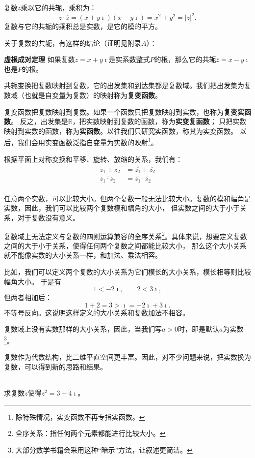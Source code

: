 \documentclass[12pt,UTF8,fontset=none]{ctexbook}
\begin{document}
复数$z$乘以它的共轭，乘积为：
$$ z \cdot \overline{z} = (x+ y\imath)(x - y\imath) = x^2 + y^2 = |z|^2. $$
复数与它的共轭的乘积总是实数，是它的模的平方。

关于复数的共轭，有这样的结论（证明见附录$A$）：
\begin{tm}{\textbf{虚根成对定理}}
    如果复数$z=x+y\imath$是实系数整式$P$的根，那么它的共轭$\overline{z}=x-y\imath$也是$P$的根。
\end{tm}

共轭变换把复数映射到复数，它的出发集和到达集都是复数域。我们把出发集为复数域（也就是自变量为复数）的映射称为\textbf{复变函数}。

复变函数把复数映射到复数。如果一个函数只把复数映射到实数，也称为\textbf{复变实函数}。
反之，出发集是$\mathbb{R}$，把实数映射到复数的函数，称为\textbf{实变复函数}；
只把实数映射到实数的函数，称为\textbf{实函数}。以往我们只研究实函数，称其为实变函数。
以后，我们会用实变函数泛指自变量为实数的映射\footnote{除特殊情况，实变函数不再专指实函数。}。

根据平面上对称变换和平移、旋转、放缩的关系，我们有：
\begin{align*}
    \overline{z_1 \pm z_2} &= \overline{z_1} \pm \overline{z_2} \\
    \overline{z_1 \cdot z_2} &= \overline{z_1} \cdot \overline{z_2} \\
\end{align*}

任意两个实数，可以比较大小。但两个复数一般无法比较大小。复数的模和幅角是实数，因此，我们可以比较两个复数模和幅角的大小，
但实数之间的大于小于关系，对于复数没有意义。

复数域上无法定义与复数的四则运算兼容的全序关系\footnote{全序关系：指任何两个元素都能进行比较大小。}。具体来说，想要定义复数之间的大于小于关系，使得任何两个复数之间都能比较大小，
那么这个大小关系就不能像实数的大小关系一样，和加法、乘法相容。

比如，我们可以定义两个复数的大小关系为它们模长的大小关系，模长相等则比较幅角大小。
于是有
$$1 < -2\imath, \qquad 2 < 3\imath,$$
但两者相加后：
$$ 1 + 2 = 3 > \imath = -2\imath + 3\imath.$$
不等号反向。这说明这样定义的大小关系和复数加法不相容。

复数域上没有实数那样的大小关系，因此，当我们写$a > 0$时，即是默认$a$为实数\footnote{大部分数学书籍会采用这种“暗示”方法，让叙述更简洁。}。

复数作为代数结构，比二维平直空间更丰富。因此，对不少问题来说，把实数换为复数，可以得到新的思路和结果。

\begin{et}
    \mbox{} \\
    求复数$z$使得$z^2 = 3 - 4\imath$。
\end{et}
\end{document}
